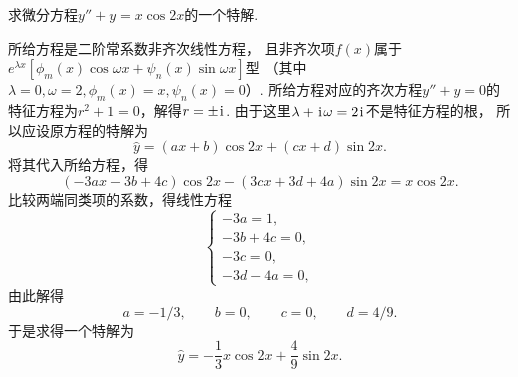 \begin{example}
求微分方程\(y'' + y = x \cos2x\)的一个特解.
\begin{solution}
所给方程是二阶常系数非齐次线性方程，
且非齐次项\(f(x)\)属于\(e^{\lambda x} [\phi_m(x) \cos\omega x + \psi_n(x) \sin\omega x]\)型
（其中\(\lambda=0,
\omega=2,
\phi_m(x) = x,
\psi_n(x) = 0\)）.
所给方程对应的齐次方程\(y''+y=0\)的特征方程为\(r^2+1=0\)，解得\(r=\pm\kern1pt\mathrm{i}\kern1pt\).
由于这里\(\lambda+\kern1pt\mathrm{i}\kern1pt\omega=2\kern1pt\mathrm{i}\kern1pt\)不是特征方程的根，
所以应设原方程的特解为\begin{equation*}
	\hat{y} = (ax+b) \cos2x + (cx+d) \sin2x.
\end{equation*}
将其代入所给方程，得\begin{equation*}
	(-3ax-3b+4c) \cos2x - (3cx+3d+4a) \sin2x = x \cos2x.
\end{equation*}
比较两端同类项的系数，得线性方程\begin{equation*}
	\left\{ \begin{array}{l}
		-3a=1, \\
		-3b+4c=0, \\
		-3c=0, \\
		-3d-4a=0,
	\end{array} \right.
\end{equation*}
由此解得\begin{equation*}
	a = -1/3, \qquad
	b = 0, \qquad
	c = 0, \qquad
	d = 4/9.
\end{equation*}
于是求得一个特解为\begin{equation*}
	\hat{y} = -\frac{1}{3} x\cos2x + \frac{4}{9} \sin2x.
\end{equation*}
\end{solution}
\end{example}

